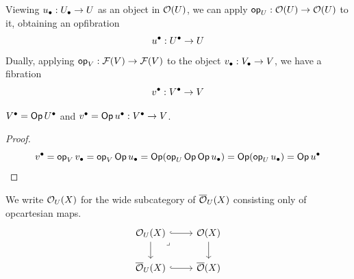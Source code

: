 Viewing $\ulow : \Ulow \to \U$ as an object in $\opfibcart(\U)$,
we can apply $\vOp[\U]{} : \opfibcart(\U) \to \opfibcart(\U)$ to it,
obtaining an opfibration
\[\uupp : \Uupp \to \U\]
Dually, applying $\vOp[\V]{} : \fibcart(\V) \to \fibcart(\V)$ to the object
$\vupp : \Vupp \to \V$,
we have a fibration
\[\vlow : \Vlow \to \V\]

\begin{lemma}\label{lem:vupp-eq}
  $\Vlow = \Op{\Uupp}$ and $\vlow = \Op{\uupp} : \Vlow \to \V$.
\end{lemma}
\begin{proof}
  \[ \vlow = \vOp[\V]{\vupp}
  = \vOp[\V]{\Op \ulow}
  = \Op (\vOp[\U]{\Op \Op \ulow})
  = \Op (\vOp[\U]{\ulow})
  = \Op {\uupp}\]
\end{proof}

We write $\opfibcart_\U(X)$ for the wide subcategory of $\opfib_\U(X)$
consisting only of opcartesian maps.
\[ \begin{tikzcd}
	{\opfibcart_\U (X)} & {\opfibcart (X)} \\
	{\opfib_\U (X)} & {\opfib (X)}
	\arrow[hook, from=1-1, to=1-2]
	\arrow[from=1-1, to=2-1]
	\arrow["\lrcorner"{anchor=center, pos=0.125}, draw=none, from=1-1, to=2-2]
	\arrow[from=1-2, to=2-2]
	\arrow[hook, from=2-1, to=2-2]
\end{tikzcd} \]

